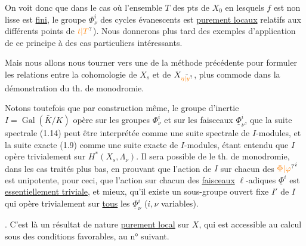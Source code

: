 On voit donc que dans le cas où l'ensemble $T$ des pts de $X_0$ en lesquels $f$ est non lisse est \uline{fini}, le  groupe $\Phi^i_\nu$ des cycles évanescents est  \uline{purement locaux}  relatifs aux différents points de $\unsure{t|T}$).  Nous donnerons plus tard des exemples  d'application de ce principe à des cas particuliers intéressants.

 Mais nous allons nous tourner  vers une   de la méthode précédente pour  formuler les relations entre la cohomologie de  $X_s$ et de $X_{\bar{\unsure{\eta|y}}}$,  plus commode dans la démonstration du th. de monodromie.

Notons toutefois  que  par construction même, le  groupe d'inertie $I=\operatorname{Gal}(\bar K/K)$ opère sur les groupes $\Phi^i_\nu$ et  sur les faisceaux $\underline\Phi^i_\nu$, que la suite spectrale (1.14) peut être interprétée comme une suite spectrale de $I$-modules, et la suite exacte (1.9) comme une suite exacte de $I$-modules, étant entendu que $I$ opère trivialement sur $H^*(X_s,\Lambda_\nu)$.  Il sera possible de  le th. de
monodromie, dans les cas  traités plus bas, en prouvant que l'action de $I$ sur chacun des ${\unsure{\Phi|\varphi}}^i$ est  unipotente,  pour ceci, que  l'action sur chacun des \uline{faisceaux} $\ell$-adiques $\underline\Phi^i$ est  \uline{essentiellement triviale}, et mieux, qu'il existe un sous-groupe  ouvert fixe $I'$ de $I$ qui opère trivialement sur \uline{tous} les \deleted{$\unsure{\Phi}$} $\underline\Phi^i_\nu$ ($i,\nu$ variables).

. C'est là un résultat de nature \uline{purement local} sur $X$, qui est accessible au calcul sous des conditions favorables,  au n° suivant.

